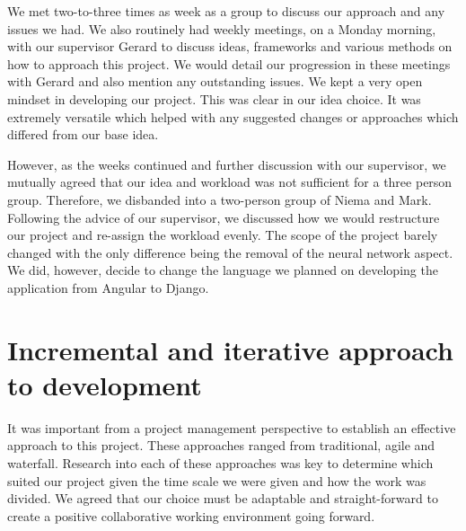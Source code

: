 We met two-to-three times as week as a group to discuss our approach and any issues we had. We also routinely had weekly meetings, on a Monday morning, with our supervisor Gerard to discuss ideas, frameworks and various methods on how to approach this project. We would detail our progression in these meetings with Gerard and also mention any outstanding issues.
We kept a very open mindset in developing our project. This was clear in our idea choice. It was extremely versatile which helped with any suggested changes or approaches which differed from our base idea.

However, as the weeks continued and further discussion with our supervisor, we mutually agreed that our idea and workload was not sufficient for a three person group. Therefore, we disbanded into a two-person group of Niema and Mark. Following the advice of our supervisor, we discussed how we would restructure our project and re-assign the workload evenly. The scope of the project barely changed with the only difference being the removal of the neural network aspect. We did, however, decide to change the language we planned on developing the application from Angular to Django.

\section{Incremental and iterative approach to development}
It was important from a project management perspective to establish an effective approach to this project. These approaches ranged from traditional, agile and waterfall. Research into each of these approaches was key to determine which suited our project given the time scale we were given and how the work was divided.
We agreed that our choice must be adaptable and straight-forward to create a positive collaborative working environment going forward.

